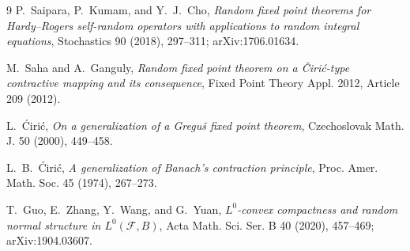 \documentclass[11pt]{article}
\begin{document}
\begin{thebibliography}{9}
P.~Saipara, P.~Kumam, and Y.~J.~Cho,
\emph{Random fixed point theorems for Hardy--Rogers self-random operators
with applications to random integral equations}, Stochastics 90 (2018),
297--311; arXiv:1706.01634.

M.~Saha and A.~Ganguly,
\emph{Random fixed point theorem on a \v{C}iri\'{c}-type contractive mapping
and its consequence}, Fixed Point Theory Appl. 2012, Article 209 (2012).

L.~\'{C}iri\'{c},
\emph{On a generalization of a Gregu\v{s} fixed point theorem},
Czechoslovak Math. J. 50 (2000), 449--458.

L.~B.~\'{C}iri\'{c},
\emph{A generalization of Banach's contraction principle},
Proc. Amer. Math. Soc. 45 (1974), 267--273.

T.~Guo, E.~Zhang, Y.~Wang, and G.~Yuan,
\emph{$L^0$-convex compactness and random normal structure in
$L^0(\mathcal F,B)$}, Acta Math. Sci. Ser. B 40 (2020), 457--469;
arXiv:1904.03607.
\end{thebibliography}
\end{document}
